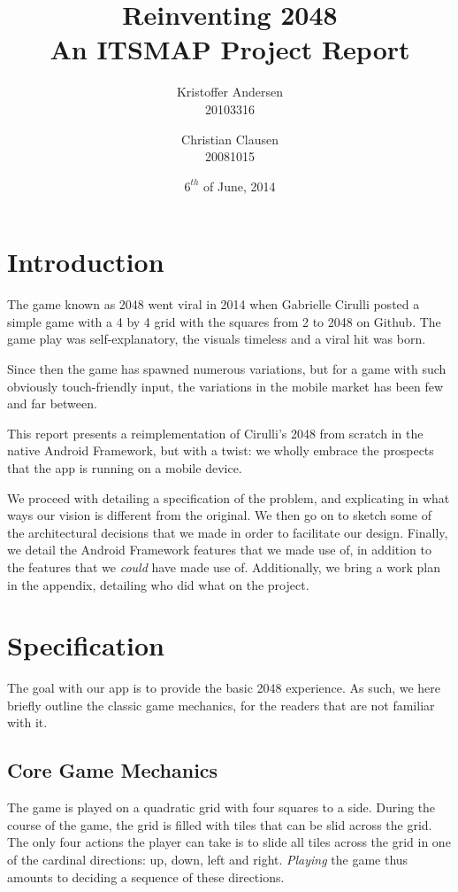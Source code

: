 \documentclass[a4paper, 12pt]{article}
\title{Reinventing 2048 \\ \large{An ITSMAP Project Report}}
\author{Kristoffer Andersen \\ \large{20103316} \and
Christian Clausen \\ \large{20081015}}
\date{$6^{th}$ of June, 2014}
\begin{document}
\maketitle
\newpage
\tableofcontents
\newpage
{}

\section{Introduction}
The game known as 2048 went viral in 2014 when Gabrielle Cirulli
posted a simple game with a 4 by 4 grid with the squares from 2 to
2048 on Github. The game play was self-explanatory, the visuals
timeless and a viral hit was born.

Since then the game has spawned numerous variations, but for a game
with such obviously touch-friendly input, the variations in the mobile
market has been few and far between.

This report presents a reimplementation of Cirulli's 2048 from scratch
in the native Android Framework, but with a twist: we wholly embrace
the prospects that the app is running on a mobile device.

We proceed with detailing a specification of the problem, and
explicating in what ways our vision is different from the original. We
then go on to sketch some of the architectural decisions that we made
in order to facilitate our design. Finally, we detail the Android
Framework features that we made use of, in addition to the features
that we \emph{could} have made use of. Additionally, we bring a work
plan in the appendix, detailing who did what on the project.

\section{Specification}
The goal with our app is to provide the basic 2048 experience. As
such, we here briefly outline the classic game mechanics, for the
readers that are not familiar with it.

\subsection{Core Game Mechanics}

The game is played on a quadratic grid with four squares to a
side. During the course of the game, the grid is filled with tiles
that can be slid across the grid. The only four actions the player can
take is to slide all tiles across the grid in one of the cardinal
directions: up, down, left and right. \emph{Playing} the game thus
amounts to deciding a sequence of these directions.
\end{document}
